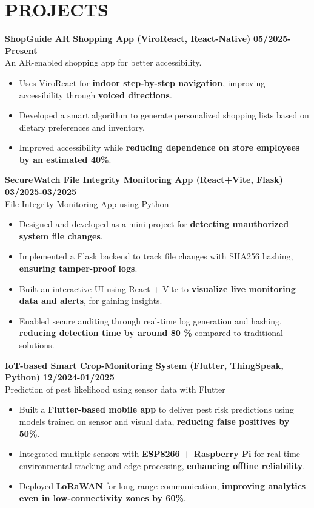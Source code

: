 \documentclass[10pt, letterpaper]{article} %
\begin{document}
\section*{PROJECTS}
\textbf{ShopGuide AR Shopping App (ViroReact, React-Native)} \hfill \textbf{05/2025-Present}  \\
An AR-enabled shopping app for better accessibility.
\begin{itemize}
    \item Uses ViroReact for \textbf{indoor step-by-step navigation}, improving accessibility through \textbf{voiced directions}.
    \item Developed a smart algorithm to generate personalized shopping lists based on dietary preferences and inventory. 
    \item Improved accessibility while \textbf{reducing dependence on store employees by an estimated 40\%}.
\end{itemize}

\vspace{0.85em}
\textbf{SecureWatch File Integrity Monitoring App (React+Vite, Flask)} \hfill \textbf{03/2025-03/2025} \href{https://github.com/Apex077/SecureTrack_File_Integrity_Monitoring_App}{\faLink} \\
File Integrity Monitoring App using Python
\begin{itemize}
    \item Designed and developed as a mini project for \textbf{detecting unauthorized system file changes}.
    \item Implemented a Flask backend to track file changes with SHA256 hashing, \textbf{ensuring tamper-proof logs}.
    \item Built an interactive UI using React + Vite to \textbf{visualize live monitoring data and alerts}, for gaining insights.
    \item Enabled secure auditing through real-time log generation and hashing, \textbf{reducing detection time by around 80 \%} compared to traditional solutions.
\end{itemize}

\vspace{0.85em} %
\textbf{IoT-based Smart Crop-Monitoring System (Flutter, ThingSpeak, Python)} \hfill \textbf{12/2024-01/2025} \href{https://github.com/Apex077/Sproutique_Flutter_App}{\faLink} \\
Prediction of pest likelihood using sensor data with Flutter
\begin{itemize}
    \item Built a \textbf{Flutter-based mobile app} to deliver pest risk predictions using models trained on sensor and visual data, \textbf{reducing false positives by 50\%}.
    \item Integrated multiple sensors with \textbf{ESP8266 + Raspberry Pi} for real-time environmental tracking and edge processing, \textbf{enhancing offline reliability}. 
    \item Deployed \textbf{LoRaWAN} for long-range communication, \textbf{improving analytics even in low-connectivity zones by 60\%}. 
\end{itemize}
\end{document}
